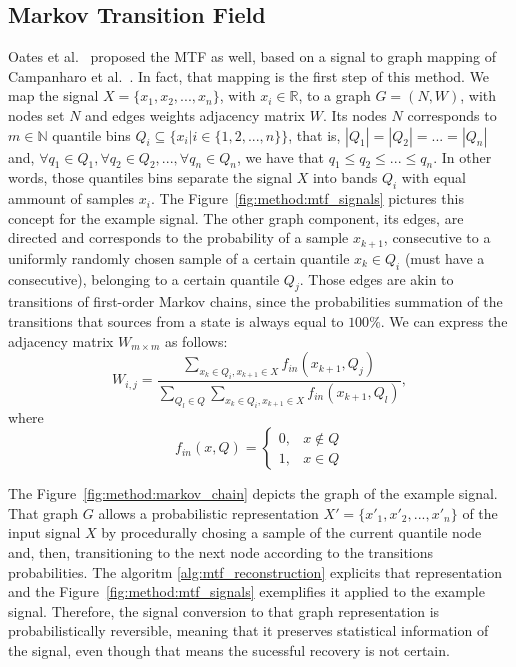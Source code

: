 \subsection{Markov Transition Field}



Oates et al.~\cite{gaf-mtf-1} proposed the \gls{MTF} as well, based on a signal to graph mapping of Campanharo et al.~\cite{mtf-1}. In fact, that mapping is the first step of this method. We map the signal $X=\{x_1,x_2,...,x_n\}$, with $x_i \in \mathbb{R}$, to a graph $G=(N,W)$, with nodes set $N$ and edges weights adjacency matrix $W$. Its nodes $N$ corresponds to $m \in \mathbb{N}$ quantile bins $Q_i \subseteq \{x_i | i \in \{1,2,...,n\}\}$, that is, $|Q_1|=|Q_2|=...=|Q_n|$ and, $\forall q_1 \in Q_1, \forall q_2 \in Q_2, ..., \forall q_n \in Q_n$, we have that $q_1 \leq q_2 \leq ... \leq q_n$. In other words, those quantiles bins separate the signal $X$ into bands $Q_i$ with equal ammount of samples $x_i$. The Figure~\ref{fig:method:mtf_signals} pictures this concept for the example signal. The other graph component, its edges, are directed and corresponds to the probability of a sample $x_{k+1}$, consecutive to a uniformly randomly chosen sample of a certain quantile $x_k \in Q_i$ (must have a consecutive), belonging to a certain quantile $Q_j$. Those edges are akin to transitions of first-order Markov chains, since the probabilities summation of the transitions that sources from a state is always equal to $100\%$. We can express the adjacency matrix $W_{m \times m}$ as follows:  
\begin{equation}
    W_{i,j} = \frac{
            \sum\limits_{x_k \in Q_i, x_{k+1} \in X} f_{in}(x_{k+1}, Q_j)
        }{
            \sum\limits_{Q_l \in Q}\sum\limits_{x_k \in Q_i, x_{k+1} \in X} f_{in}(x_{k+1}, Q_l) 
        },
\end{equation}
where
\begin{equation}
    f_{in}(x,Q) = \begin{cases}
        0, & x \not\in Q \\
        1, & x \in Q
    \end{cases}
\end{equation}




\noindent The Figure~\ref{fig:method:markov_chain} depicts the graph of the example signal. That graph $G$ allows a probabilistic representation $X' = \{ x'_1,x'_2,...,x'_n \}$ of the input signal $X$ by procedurally chosing a sample of the current quantile node and, then, transitioning to the next node according to the transitions probabilities. The algoritm \ref{alg:mtf_reconstruction} explicits that representation and the Figure~\ref{fig:method:mtf_signals} exemplifies it applied to the example signal. Therefore, the signal conversion to that graph representation is probabilistically reversible, meaning that it preserves statistical information of the signal, even though that means the sucessful recovery is not certain.


